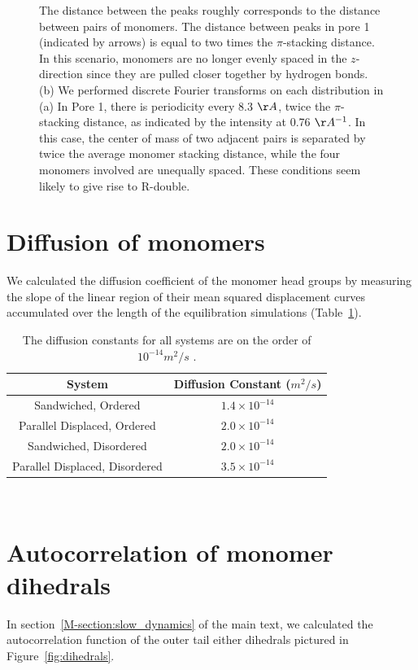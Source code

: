 \documentclass{article}
\begin{document}
\begin{figure}[!htb]
{  The distance between the peaks roughly corresponds to the distance between pairs of 
  monomers. The distance between peaks in pore 1 (indicated by arrows) is equal to two 
  times the $\pi$-stacking distance. In this scenario, monomers are no longer evenly spaced
  in the $z$-direction since they are pulled closer together by hydrogen bonds. (b) We 
  performed discrete Fourier transforms on each distribution in (a) In Pore 1, there 
  is periodicity every 8.3 $\AA$, twice the $\pi$-stacking distance, as indicated by the
  intensity at 0.76 $\AA^{-1}$. In this case, the center of mass of two adjacent pairs 
  is separated by twice the average monomer stacking distance, while the four monomers 
  involved are unequally spaced. These conditions seem likely to give rise to R-double.
  }\label{fig:hbonds}
  \end{figure}
  
  \section{Diffusion of monomers}

  We calculated the diffusion coefficient of the monomer head groups by measuring
  the slope of the linear region of their mean squared displacement curves accumulated
  over the length of the equilibration simulations (Table~\ref{table:msd}). 
  
  \begin{table}[h]
  \centering
  \begin{tabular}{cc}
  \toprule
  System & Diffusion Constant ($m^2/s$) \\ 
  \midrule
  Sandwiched, Ordered & $1.4 \times 10^{-14}$ \\
  Parallel Displaced, Ordered & $2.0 \times 10^{-14}$ \\
  Sandwiched, Disordered & $2.0 \times 10^{-14}$ \\
  Parallel Displaced, Disordered & $3.5 \times 10^{-14}$ \\
  \bottomrule
  \end{tabular}
  \caption{The diffusion constants for all systems are on the order of $10^{-14} m^2/s$ 
  .}~\label{table:msd}
  \end{table}
  
  \section{Autocorrelation of monomer dihedrals}
  
  In section~\ref{M-section:slow_dynamics} of the main text, we calculated the
  autocorrelation function of the outer tail either dihedrals pictured
  in Figure~\ref{fig:dihedrals}.
  
\end{document}
